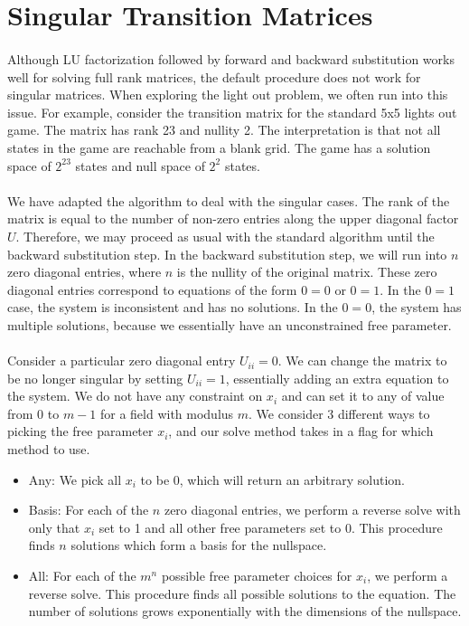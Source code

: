 \documentclass[11pt]{article}
\begin{document}
\section*{Singular Transition Matrices}
\paragraph{} Although LU factorization followed by forward and backward substitution works well for solving full rank matrices, the default procedure does not work for singular matrices.  When exploring the light out problem, we often run into this issue.  For example, consider the transition matrix for the standard 5x5 lights out game.  The matrix has rank 23 and nullity 2.  The interpretation is that not all states in the game are reachable from a blank grid.  The game has a solution space of $2^{23}$ states and null space of $2^2$ states.


\paragraph{} We have adapted the algorithm to deal with the singular cases.  The rank of the matrix is equal to the number of non-zero entries along the upper diagonal factor $U$.  Therefore, we may proceed as usual with the standard algorithm until the backward substitution step.  In the backward substitution step, we will run into $n$ zero diagonal entries, where $n$ is the nullity of the original matrix.  These zero diagonal entries correspond to equations of the form $0 = 0$ or $0 = 1$.  In the $0 = 1$ case, the system is inconsistent and has no solutions.  In the $0 = 0$, the system has multiple solutions, because we essentially have an unconstrained free parameter.


\paragraph{} Consider a particular zero diagonal entry $U_{ii} = 0$.  We can change the matrix to be no longer singular by setting $U_{ii} = 1$, essentially adding an extra equation to the system.  We do not have any constraint on $x_i$ and can set it to any of value from 0 to $m - 1$ for a field with modulus $m$.  We consider 3 different ways to picking the free parameter $x_i$, and our solve method takes in a flag for which method to use.

\begin{itemize}
\item Any: We pick all $x_i$ to be 0, which will return an arbitrary solution.
\item Basis: For each of the $n$ zero diagonal entries, we perform a reverse solve with only that $x_i$ set to 1 and all other free parameters set to 0.  This procedure finds $n$ solutions which form a basis for the nullspace.
\item All: For each of the $m^n$ possible free parameter choices for $x_i$, we perform a reverse solve.  This procedure finds all possible solutions to the equation.  The number of solutions grows exponentially with the dimensions of the nullspace.
\end{itemize}
\end{document}
